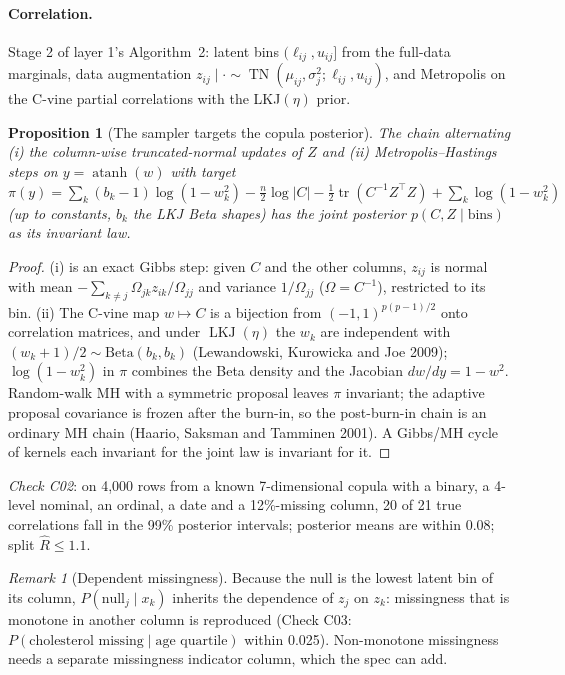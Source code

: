 \documentclass[11pt,a4paper]{article}
\newtheorem{proposition}{Proposition}
\theoremstyle{definition}
\theoremstyle{remark}
\newtheorem{remark}{Remark}
\newcommand{\LKJ}{\operatorname{LKJ}}
\newcommand{\TN}{\operatorname{TN}}
\begin{document}
\paragraph{Correlation.} Stage 2 of layer 1's Algorithm~2: latent bins $(\ell_{ij},u_{ij}]$ from the full-data marginals, data augmentation $z_{ij}\mid\cdot\sim\TN(\mu_{ij},\sigma_j^2;\ell_{ij},u_{ij})$, and Metropolis on the C-vine partial correlations with the LKJ$(\eta)$ prior.

\begin{proposition}[The sampler targets the copula posterior]\label{prop:copula}
The chain alternating (i) the column-wise truncated-normal updates of $Z$ and (ii) Metropolis--Hastings steps on $y=\operatorname{atanh}(w)$ with target $\pi(y)=\sum_k(b_k-1)\log(1-w_k^2)-\tfrac n2\log|C|-\tfrac12\operatorname{tr}(C^{-1}Z^\top Z)+\sum_k\log(1-w_k^2)$ (up to constants, $b_k$ the LKJ Beta shapes) has the joint posterior $p(C,Z\mid\text{bins})$ as its invariant law.
\end{proposition}
\begin{proof}
(i) is an exact Gibbs step: given $C$ and the other columns, $z_{ij}$ is normal with mean $-\sum_{k\ne j}\Omega_{jk}z_{ik}/\Omega_{jj}$ and variance $1/\Omega_{jj}$ ($\Omega=C^{-1}$), restricted to its bin. (ii) The C-vine map $w\mapsto C$ is a bijection from $(-1,1)^{p(p-1)/2}$ onto correlation matrices, and under $\LKJ(\eta)$ the $w_k$ are independent with $(w_k+1)/2\sim\mathrm{Beta}(b_k,b_k)$ (Lewandowski, Kurowicka and Joe 2009); $\log(1-w_k^2)$ in $\pi$ combines the Beta density and the Jacobian $dw/dy=1-w^2$. Random-walk MH with a symmetric proposal leaves $\pi$ invariant; the adaptive proposal covariance is frozen after the burn-in, so the post-burn-in chain is an ordinary MH chain (Haario, Saksman and Tamminen 2001). A Gibbs/MH cycle of kernels each invariant for the joint law is invariant for it.
\end{proof}
\noindent\emph{Check C02}: on 4,000 rows from a known 7-dimensional copula with a binary, a 4-level nominal, an ordinal, a date and a 12\%-missing column, 20 of 21 true correlations fall in the 99\% posterior intervals; posterior means are within 0.08; split $\hat R\le1.1$.

\begin{remark}[Dependent missingness]\label{rem:null}
Because the null is the lowest latent bin of its column, $P(\text{null}_j\mid x_k)$ inherits the dependence of $z_j$ on $z_k$: missingness that is monotone in another column is reproduced (Check C03: $P(\text{cholesterol missing}\mid\text{age quartile})$ within 0.025). Non-monotone missingness needs a separate missingness indicator column, which the spec can add.
\end{remark}
\end{document}
